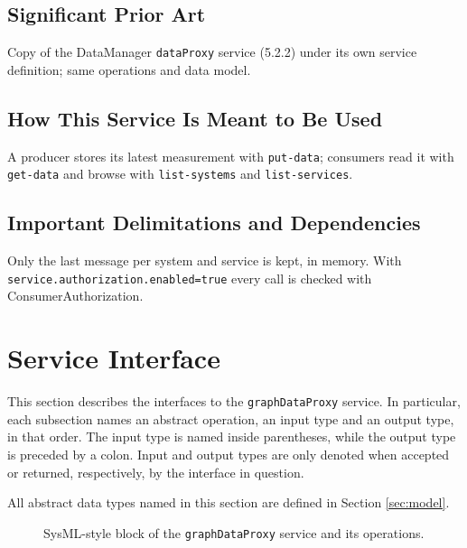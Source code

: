 \documentclass[a4paper]{arrowhead}
\begin{document}
\subsection{Significant Prior Art}

Copy of the DataManager \texttt{dataProxy} service (5.2.2) under its own service definition; same operations and data model.

\subsection{How This Service Is Meant to Be Used}

A producer stores its latest measurement with \texttt{put-\allowbreak{}data}; consumers read it with \texttt{get-\allowbreak{}data} and browse with \texttt{list-\allowbreak{}systems} and \texttt{list-\allowbreak{}services}.

\subsection{Important Delimitations and Dependencies}
\label{sec:delimitations}

Only the last message per system and service is kept, in memory. With \texttt{service.\allowbreak{}authorization.\allowbreak{}enabled=\allowbreak{}true} every call is checked with Consumer\allowbreak{}Authorization.

\newpage

\section{Service Interface}
\label{sec:operations}

This section describes the interfaces to the \texttt{graphDataProxy} service.
In particular, each subsection names an abstract operation, an input type and an output type, in that order.
The input type is named inside parentheses, while the output type is preceded by a colon.
Input and output types are only denoted when accepted or returned, respectively, by the interface in question.

All abstract data types named in this section are defined in Section \ref{sec:model}.

\begin{figure}[ht!]
  \centering
  \caption{SysML-style block of the \texttt{graphDataProxy} service and its operations.}
  \label{fig:SD}
\end{figure}
\end{document}

